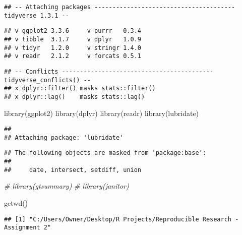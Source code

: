 \documentclass[
]{article}
\newenvironment{Shaded}{\begin{snugshade}}{\end{snugshade}}
\newcommand{\CommentTok}[1]{\textcolor[rgb]{0.56,0.35,0.01}{\textit{#1}}}
\newcommand{\FunctionTok}[1]{\textcolor[rgb]{0.00,0.00,0.00}{#1}}
\newcommand{\NormalTok}[1]{#1}
\begin{document}
\begin{verbatim}
## -- Attaching packages --------------------------------------- tidyverse 1.3.1 --
\end{verbatim}

\begin{verbatim}
## v ggplot2 3.3.6     v purrr   0.3.4
## v tibble  3.1.7     v dplyr   1.0.9
## v tidyr   1.2.0     v stringr 1.4.0
## v readr   2.1.2     v forcats 0.5.1
\end{verbatim}

\begin{verbatim}
## -- Conflicts ------------------------------------------ tidyverse_conflicts() --
## x dplyr::filter() masks stats::filter()
## x dplyr::lag()    masks stats::lag()
\end{verbatim}

\begin{Shaded}
\begin{Highlighting}[]
\FunctionTok{library}\NormalTok{(ggplot2)}
\FunctionTok{library}\NormalTok{(dplyr)}
\FunctionTok{library}\NormalTok{(readr)}
\FunctionTok{library}\NormalTok{(lubridate)}
\end{Highlighting}
\end{Shaded}

\begin{verbatim}
## 
## Attaching package: 'lubridate'
\end{verbatim}

\begin{verbatim}
## The following objects are masked from 'package:base':
## 
##     date, intersect, setdiff, union
\end{verbatim}

\begin{Shaded}
\begin{Highlighting}[]
\CommentTok{\# library(gtsummary)}
\CommentTok{\# library(janitor)}
\end{Highlighting}
\end{Shaded}

\begin{Shaded}
\begin{Highlighting}[]
\FunctionTok{getwd}\NormalTok{()}
\end{Highlighting}
\end{Shaded}

\begin{verbatim}
## [1] "C:/Users/Owner/Desktop/R Projects/Reproducible Research - Assignment 2"
\end{verbatim}
\end{document}
